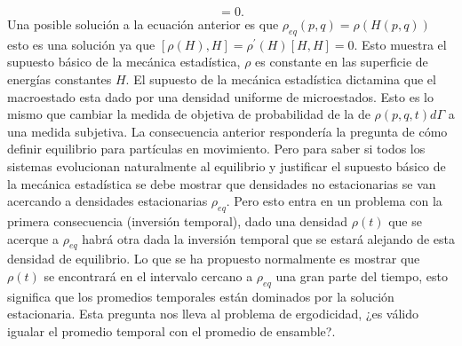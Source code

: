 \begin{equation}
[\rho_{eq}, H]=0.
\end{equation}
Una posible solución a la ecuación anterior es que $\rho_{eq}(p,q)=\rho(H(p,q))$ esto es una solución ya que $[\rho(H),H]=\rho^{'}(H)[H,H]=0$. Esto muestra el supuesto básico de la mecánica estadística, $\rho$ es constante en las superficie de energías constantes $H$. El supuesto de la mecánica estadística dictamina que el macroestado esta dado por una densidad uniforme de microestados. Esto es lo mismo que cambiar la medida de objetiva de probabilidad de la de $\rho(p,q,t) d\Gamma$ a una medida subjetiva.
La consecuencia anterior respondería la pregunta de cómo definir equilibrio para partículas en movimiento. Pero para saber si todos los sistemas evolucionan naturalmente al equilibrio  y justificar el supuesto básico de la mecánica estadística se debe mostrar que densidades no estacionarias se van acercando a densidades estacionarias $\rho_{eq}$. Pero esto entra en un problema con la primera consecuencia (inversión temporal), dado una densidad $\rho(t)$ que se acerque a $\rho_{eq}$ habrá otra dada la inversión temporal que se estará alejando de esta densidad de equilibrio. Lo que se ha propuesto normalmente es mostrar que $\rho(t)$ se encontrará en el intervalo cercano a $\rho_{eq}$ una gran parte del tiempo, esto significa que los promedios temporales están dominados por la solución estacionaria. Esta pregunta nos lleva al problema de ergodicidad, ¿es válido igualar el promedio temporal con el promedio de ensamble?.

